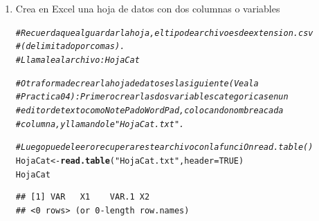 \documentclass[12pt,letterpaper]{article}\usepackage[]{graphicx}\usepackage[]{color}
\makeatletter
\newcommand{\hlnum}[1]{\textcolor[rgb]{0.686,0.059,0.569}{#1}}%
\newcommand{\hlstr}[1]{\textcolor[rgb]{0.192,0.494,0.8}{#1}}%
\newcommand{\hlcom}[1]{\textcolor[rgb]{0.678,0.584,0.686}{\textit{#1}}}%
\newcommand{\hlstd}[1]{\textcolor[rgb]{0.345,0.345,0.345}{#1}}%
\newcommand{\hlkwb}[1]{\textcolor[rgb]{0.69,0.353,0.396}{#1}}%
\newcommand{\hlkwc}[1]{\textcolor[rgb]{0.333,0.667,0.333}{#1}}%
\newcommand{\hlkwd}[1]{\textcolor[rgb]{0.737,0.353,0.396}{\textbf{#1}}}%
\newenvironment{kframe}{%
 \def\at@end@of@kframe{}%
 \ifinner\ifhmode%
  \def\at@end@of@kframe{\end{minipage}}%
  \begin{minipage}{\columnwidth}%
 \fi\fi%
 \def\FrameCommand##1{\hskip\@totalleftmargin \hskip-\fboxsep
 \colorbox{shadecolor}{##1}\hskip-\fboxsep
     \hskip-\linewidth \hskip-\@totalleftmargin \hskip\columnwidth}%
 \MakeFramed {\advance\hsize-\width
   \@totalleftmargin\z@ \linewidth\hsize
   \@setminipage}}%
 {\par\unskip\endMakeFramed%
 \at@end@of@kframe}
\newenvironment{knitrout}{}{} %
\makeatother
\begin{document}
\begin{enumerate}
\item Crea en Excel una hoja de datos con dos columnas o variables 
\begin{knitrout}
\color{fgcolor}\begin{kframe}
\begin{alltt}
\hlcom{# Recuerda que al guardar la hoja, el tipo de archivo es de extension .csv}
\hlcom{# (delimitado por comas). }
\hlcom{# Llamale al archivo: HojaCat }
\end{alltt}
\end{kframe}
\end{knitrout}
\begin{knitrout}
\color{fgcolor}\begin{kframe}
\begin{alltt}
\hlcom{# Otra forma de crear la hoja de datos es la siguiente (Vea la }
\hlcom{# Practica 04): Primero crear las dos variables categoricas en un }
\hlcom{# editor de texto como NotePad o WordPad, colocando nombre a cada }
\hlcom{# columna, y llamandole "HojaCat.txt". }
\end{alltt}
\end{kframe}
\end{knitrout}
\begin{knitrout}
\color{fgcolor}\begin{kframe}
\begin{alltt}
\hlcom{# Luego puede leer o recuperar este archivo con la funciOn read.table() }
\hlstd{HojaCat} \hlkwb{<-} \hlkwd{read.table}\hlstd{(}\hlstr{"HojaCat.txt"}\hlstd{,} \hlkwc{header}\hlstd{=}\hlnum{TRUE}\hlstd{)}
\hlstd{HojaCat}
\end{alltt}
\begin{verbatim}
## [1] VAR   X1    VAR.1 X2   
## <0 rows> (or 0-length row.names)
\end{verbatim}
\end{kframe}
\end{knitrout}


\end{enumerate}
\end{document}
